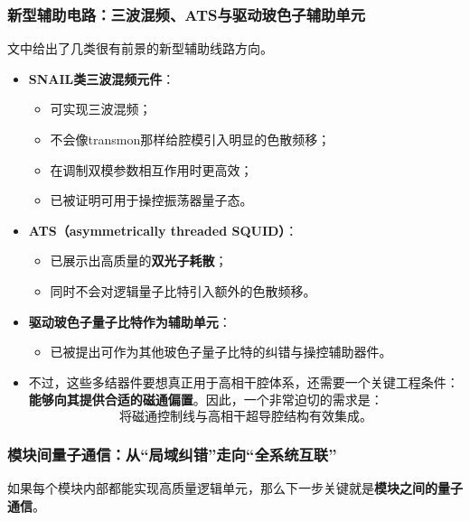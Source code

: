\documentclass[12pt,a4paper,oneside]{ctexbook}
\begin{document}
\subsubsection{新型辅助电路：三波混频、ATS与驱动玻色子辅助单元}

文中给出了几类很有前景的新型辅助线路方向。

\begin{itemize}
    \item \textbf{SNAIL类三波混频元件}：
    \begin{itemize}
        \item 可实现三波混频；
        \item 不会像transmon那样给腔模引入明显的色散频移；
        \item 在调制双模参数相互作用时更高效；
        \item 已被证明可用于操控振荡器量子态。
    \end{itemize}
    
    \item \textbf{ATS（asymmetrically threaded SQUID）}：
    \begin{itemize}
        \item 已展示出高质量的\textbf{双光子耗散}；
        \item 同时不会对逻辑量子比特引入额外的色散频移。
    \end{itemize}
    
    \item \textbf{驱动玻色子量子比特作为辅助单元}：
    \begin{itemize}
        \item 已被提出可作为其他玻色子量子比特的纠错与操控辅助器件。
    \end{itemize}
    
    \item 不过，这些多结器件要想真正用于高相干腔体系，还需要一个关键工程条件：\textbf{能够向其提供合适的磁通偏置}。因此，一个非常迫切的需求是：
    \[
    \text{将磁通控制线与高相干超导腔结构有效集成。}
    \]
\end{itemize}

\subsubsection{模块间量子通信：从“局域纠错”走向“全系统互联”}

如果每个模块内部都能实现高质量逻辑单元，那么下一步关键就是\textbf{模块之间的量子通信}。
\end{document}
